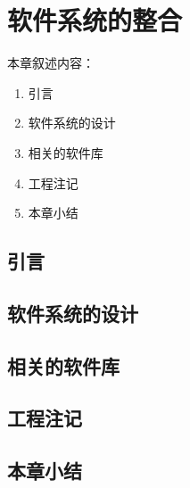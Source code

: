 \chapter{软件系统的整合}
\label{chap1a}

本章叙述内容：
\begin{enumerate}
  \item 引言
  \item 软件系统的设计
  \item 相关的软件库
  \item 工程注记
  \item 本章小结
\end{enumerate}

\section{引言}

\section{软件系统的设计}

\section{相关的软件库}

\section{工程注记}

\section{本章小结} 